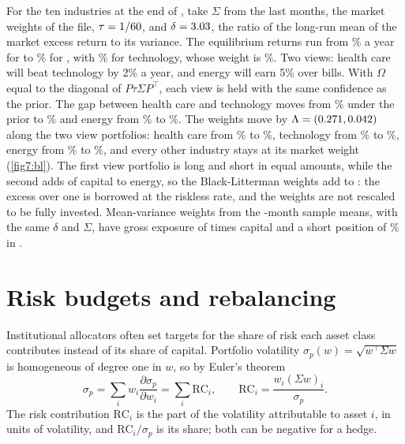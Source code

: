 \begin{chapterrefs}
For the ten industries at the end of \fqLast, take $\Sigma$ from the last \blW{} months, the market
weights of the file, $\tau=1/60$, and $\delta=3.03$, the ratio of the long-run mean of the
market excess return to its variance. The equilibrium returns run from \blPiMin\% a year for
\blPiMinName{} to \blPiMax\% for \blPiMaxName, with \blPiHiTec\% for technology, whose weight is
\blWmHiTec\%. Two views: health care will beat technology by 2\% a year, and energy will earn 5\% over
bills. With $\Omega$ equal to the diagonal of $P\tau\Sigma P^\top$, each view is held with the same
confidence as the prior. The gap between health care and technology moves from \blViewOneBefore\% under
the prior to \blViewOneAfter\% and energy from \blViewTwoBefore\% to \blViewTwoAfter\%. The weights move
by $\Lambda=(0.271,0.042)$ along the two view portfolios: health care from \blWmHlth\% to
\blWblHlth\%, technology from \blWmHiTec\% to \blWblHiTec\%, energy from \blWmEnrgy\% to \blWblEnrgy\%,
and every other industry stays at its market weight (\cref{fig7:bl}). The first view portfolio is long
and short in equal amounts, while the second adds \blLamTwo{} of capital to energy, so the
Black-Litterman weights add to \blBlSum{}: the excess over one is borrowed at the riskless rate, and the
weights are not rescaled to be fully invested. Mean-variance weights from the
\blW-month sample means, with the same $\delta$ and $\Sigma$, have gross exposure of \blMvGross{} times
capital and a short position of \blMvMax\% in \blMvMaxName.



\FloatBarrier
\section{Risk budgets and rebalancing}
\label{sec7:risk}

Institutional allocators often set targets for the share of risk each asset class contributes
instead of its share of capital. Portfolio volatility $\sigma_p(w)=\sqrt{w^\top\Sigma w}$ is
homogeneous of degree one in $w$, so by Euler's theorem
\begin{equation}\label{eq7:euler}
  \sigma_p=\sum_iw_i\frac{\partial\sigma_p}{\partial w_i}=\sum_i\mathrm{RC}_i,\qquad
  \mathrm{RC}_i=\frac{w_i(\Sigma w)_i}{\sigma_p}.
\end{equation}
The risk contribution $\mathrm{RC}_i$ is the part of the volatility attributable to asset $i$, in units
of volatility, and $\mathrm{RC}_i/\sigma_p$ is its share; both can be negative for a hedge.


\end{chapterrefs}
